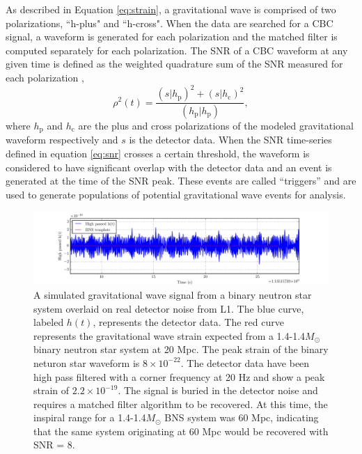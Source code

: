 As described in Equation \ref{eq:strain}, a gravitational wave is comprised of two 
polarizations, ``h-plus" and ``h-cross". When the data are searched for a CBC  
signal, a waveform is generated for each polarization and the matched filter is 
computed separately for each polarization. 
The SNR of a CBC waveform at any given time is defined as the weighted quadrature sum 
of the SNR measured for each polarization \cite{Allen:2005fk}, 
\begin{equation}
\rho^2(t) = \frac{(s|h_\mathrm{p})^2 + (s|h_\mathrm{c})^2}{(h_\mathrm{p}|h_\mathrm{p})},
\label{eq:snr}
\end{equation}
where $h_\mathrm{p}$ and $h_\mathrm{c}$ are the plus and cross polarizations of the 
modeled gravitational waveform respectively and $s$ is the detector data. 
When the SNR time-series defined in equation \ref{eq:snr} crosses a certain threshold, 
the waveform is considered to have significant overlap with the detector data and an 
event is generated at the time of the SNR peak. These events are called ``triggers'' 
and are used to generate populations of potential gravitational wave events for analysis.

\begin{figure}[ht!]
\includegraphics[width=\textwidth]{figures/introduction/quiet_BNS}
\caption[BNS signal in detector noise]{A simulated gravitational wave signal from a %
         binary neutron star system overlaid on real detector noise from L1. %
         The blue curve, labeled $h(t)$, represents the detector data. %
         The red curve represents %
         the gravitational wave strain expected from a 1.4-1.4$M_{\odot}$ %
         binary neutron star system %
         at 20 Mpc. The peak strain of the binary neturon star waveform is %
         $8\times10^{-22}$. %
         The detector data have been high pass filtered with a corner frequency %
         at 20 Hz and show a peak strain of $2.2\times10^{-19}$. The signal is %
         buried in the detector noise and requires a matched filter algorithm %
         to be recovered. At this time, the inspiral range for a 1.4-1.4$M_{\odot}$ %
         BNS system was 60 Mpc, indicating that the same system originating at 60 Mpc %
         would be recovered with SNR = 8. %
         }
\label{fig:quiet-BNS}
\end{figure}

